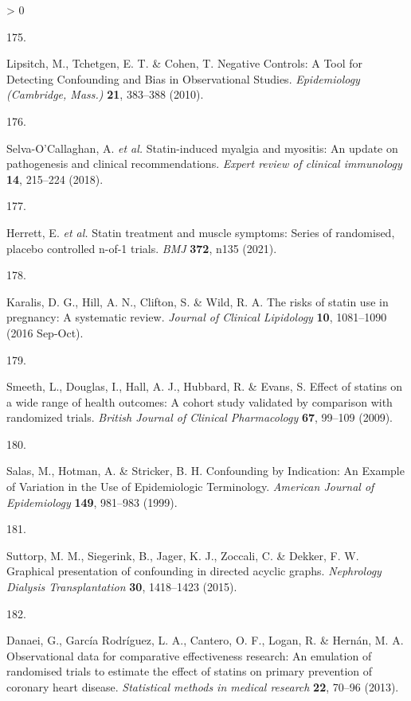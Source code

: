 \documentclass[a4paper, twoside]{templates/ociamthesis}
\newlength{\cslhangindent}
\newlength{\csllabelwidth}
\newenvironment{CSLReferences}[3] %
 {%
  \setlength{\parindent}{0pt}
  \ifodd #1 \everypar{\setlength{\hangindent}{\cslhangindent}}\ignorespaces\fi
  \ifnum #2 > 0
  \setlength{\parskip}{#2\baselineskip}
  \fi
 }%
 {}
\newcommand{\CSLLeftMargin}[1]{\parbox[t]{\maxof{\widthof{#1}}{\csllabelwidth}}{#1}}
\newcommand{\CSLRightInline}[1]{\parbox[t]{\linewidth - \csllabelwidth}{#1}}
\begin{document}
\begin{CSLReferences}{0}{0}
\leavevmode\hypertarget{ref-lipsitch2010}{}%
\CSLLeftMargin{175. }
\CSLRightInline{Lipsitch, M., Tchetgen, E. T. \& Cohen, T. Negative {Controls}: {A Tool} for {Detecting Confounding} and {Bias} in {Observational Studies}. \emph{Epidemiology (Cambridge, Mass.)} \textbf{21}, 383--388 (2010).}

\leavevmode\hypertarget{ref-selva-ocallaghan2018}{}%
\CSLLeftMargin{176. }
\CSLRightInline{Selva-O'Callaghan, A. \emph{et al.} Statin-induced myalgia and myositis: An update on pathogenesis and clinical recommendations. \emph{Expert review of clinical immunology} \textbf{14}, 215--224 (2018).}

\leavevmode\hypertarget{ref-herrett2021}{}%
\CSLLeftMargin{177. }
\CSLRightInline{Herrett, E. \emph{et al.} Statin treatment and muscle symptoms: Series of randomised, placebo controlled n-of-1 trials. \emph{BMJ} \textbf{372}, n135 (2021).}

\leavevmode\hypertarget{ref-karalis2016}{}%
\CSLLeftMargin{178. }
\CSLRightInline{Karalis, D. G., Hill, A. N., Clifton, S. \& Wild, R. A. The risks of statin use in pregnancy: {A} systematic review. \emph{Journal of Clinical Lipidology} \textbf{10}, 1081--1090 (2016 Sep-Oct).}

\leavevmode\hypertarget{ref-smeeth2009}{}%
\CSLLeftMargin{179. }
\CSLRightInline{Smeeth, L., Douglas, I., Hall, A. J., Hubbard, R. \& Evans, S. Effect of statins on a wide range of health outcomes: A cohort study validated by comparison with randomized trials. \emph{British Journal of Clinical Pharmacology} \textbf{67}, 99--109 (2009).}

\leavevmode\hypertarget{ref-salas1999}{}%
\CSLLeftMargin{180. }
\CSLRightInline{Salas, M., Hotman, A. \& Stricker, B. H. Confounding by {Indication}: {An Example} of {Variation} in the {Use} of {Epidemiologic Terminology}. \emph{American Journal of Epidemiology} \textbf{149}, 981--983 (1999).}

\leavevmode\hypertarget{ref-suttorp2015}{}%
\CSLLeftMargin{181. }
\CSLRightInline{Suttorp, M. M., Siegerink, B., Jager, K. J., Zoccali, C. \& Dekker, F. W. Graphical presentation of confounding in directed acyclic graphs. \emph{Nephrology Dialysis Transplantation} \textbf{30}, 1418--1423 (2015).}

\leavevmode\hypertarget{ref-danaei2013b}{}%
\CSLLeftMargin{182. }
\CSLRightInline{Danaei, G., García Rodríguez, L. A., Cantero, O. F., Logan, R. \& Hernán, M. A. Observational data for comparative effectiveness research: An emulation of randomised trials to estimate the effect of statins on primary prevention of coronary heart disease. \emph{Statistical methods in medical research} \textbf{22}, 70--96 (2013).}


\end{CSLReferences}
\end{document}
